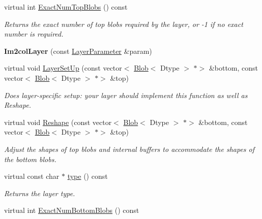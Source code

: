 \begin{DoxyCompactItemize}
virtual int \mbox{\hyperlink{classcaffe_1_1_im2col_layer_ab2cf1f7dd41b801ed32471ec492d423c}{Exact\+Num\+Top\+Blobs}} () const
\begin{DoxyCompactList}\small\item\em Returns the exact number of top blobs required by the layer, or -\/1 if no exact number is required. \end{DoxyCompactList}\item 
\mbox{\label{classcaffe_1_1_im2col_layer_aec089ca3ca3caf3d32193b9dcb2f98e1}} 
{\bfseries Im2col\+Layer} (const \mbox{\hyperlink{classcaffe_1_1_layer_parameter}{Layer\+Parameter}} \&param)
\item 
virtual void \mbox{\hyperlink{classcaffe_1_1_im2col_layer_a45f559e3d3841e15b8bcb39ec061cfcb}{Layer\+Set\+Up}} (const vector$<$ \mbox{\hyperlink{classcaffe_1_1_blob}{Blob}}$<$ Dtype $>$ $\ast$$>$ \&bottom, const vector$<$ \mbox{\hyperlink{classcaffe_1_1_blob}{Blob}}$<$ Dtype $>$ $\ast$$>$ \&top)
\begin{DoxyCompactList}\small\item\em Does layer-\/specific setup\+: your layer should implement this function as well as Reshape. \end{DoxyCompactList}\item 
virtual void \mbox{\hyperlink{classcaffe_1_1_im2col_layer_a18fcf2571b0c73b6dd828a7fc7caf5e6}{Reshape}} (const vector$<$ \mbox{\hyperlink{classcaffe_1_1_blob}{Blob}}$<$ Dtype $>$ $\ast$$>$ \&bottom, const vector$<$ \mbox{\hyperlink{classcaffe_1_1_blob}{Blob}}$<$ Dtype $>$ $\ast$$>$ \&top)
\begin{DoxyCompactList}\small\item\em Adjust the shapes of top blobs and internal buffers to accommodate the shapes of the bottom blobs. \end{DoxyCompactList}\item 
\mbox{\label{classcaffe_1_1_im2col_layer_a8f3b31bc7134edbc8e3286b2c65e294e}} 
virtual const char $\ast$ \mbox{\hyperlink{classcaffe_1_1_im2col_layer_a8f3b31bc7134edbc8e3286b2c65e294e}{type}} () const
\begin{DoxyCompactList}\small\item\em Returns the layer type. \end{DoxyCompactList}\item 
virtual int \mbox{\hyperlink{classcaffe_1_1_im2col_layer_a35772d667af49afe707c7b1db881c573}{Exact\+Num\+Bottom\+Blobs}} () const

\end{DoxyCompactItemize}
